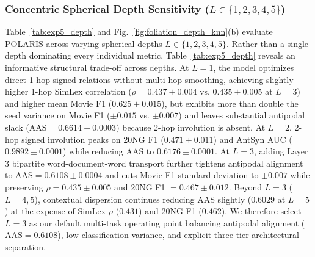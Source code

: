 \documentclass[journal]{IEEEtran}
\begin{document}
\subsubsection{Concentric Spherical Depth Sensitivity ($L \in \{1, 2, 3, 4, 5\}$)}
Table~\ref{tab:exp5_depth} and Fig.~\ref{fig:foliation_depth_knn}(b) evaluate POLARIS across varying spherical depths $L \in \{1, 2, 3, 4, 5\}$. Rather than a single depth dominating every individual metric, Table~\ref{tab:exp5_depth} reveals an informative structural trade-off across depths. At $L=1$, the model optimizes direct 1-hop signed relations without multi-hop smoothing, achieving slightly higher 1-hop SimLex correlation ($\rho = 0.437 \pm 0.004$ vs. $0.435 \pm 0.005$ at $L=3$) and higher mean Movie F1 ($0.625 \pm 0.015$), but exhibits more than double the seed variance on Movie F1 ($\pm 0.015$ vs. $\pm 0.007$) and leaves substantial antipodal slack ($\text{AAS} = 0.6614 \pm 0.0003$) because 2-hop involution is absent. At $L=2$, 2-hop signed involution peaks on 20NG F1 ($0.471 \pm 0.011$) and AntSyn AUC ($0.9892 \pm 0.0001$) while reducing AAS to $0.6176 \pm 0.0001$. At $L=3$, adding Layer 3 bipartite word-document-word transport further tightens antipodal alignment to $\text{AAS} = 0.6108 \pm 0.0004$ and cuts Movie F1 standard deviation to $\pm 0.007$ while preserving $\rho = 0.435 \pm 0.005$ and 20NG F1 $= 0.467 \pm 0.012$. Beyond $L=3$ ($L=4, 5$), contextual dispersion continues reducing AAS slightly ($0.6029$ at $L=5$) at the expense of SimLex $\rho$ ($0.431$) and 20NG F1 ($0.462$). We therefore select $L=3$ as our default multi-task operating point balancing antipodal alignment ($\text{AAS} = 0.6108$), low classification variance, and explicit three-tier architectural separation.
\end{document}
